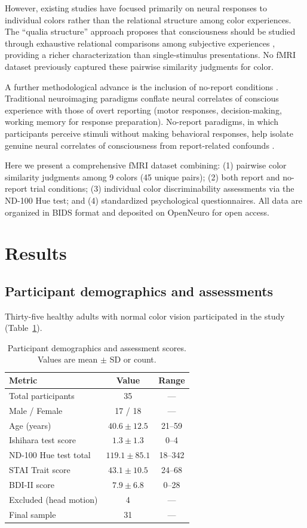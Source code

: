 \documentclass[11pt]{article}
\begin{document}
However, existing studies have focused primarily on neural responses to individual colors rather than the relational structure among color experiences. The ``qualia structure'' approach proposes that consciousness should be studied through exhaustive relational comparisons among subjective experiences \citep{haun2017}, providing a richer characterization than single-stimulus presentations. No fMRI dataset previously captured these pairwise similarity judgments for color.

A further methodological advance is the inclusion of no-report conditions \citep{tsuchiya2015}. Traditional neuroimaging paradigms conflate neural correlates of conscious experience with those of overt reporting (motor responses, decision-making, working memory for response preparation). No-report paradigms, in which participants perceive stimuli without making behavioral responses, help isolate genuine neural correlates of consciousness from report-related confounds \citep{koch2016}.

Here we present a comprehensive fMRI dataset combining: (1) pairwise color similarity judgments among 9 colors (45 unique pairs); (2) both report and no-report trial conditions; (3) individual color discriminability assessments via the ND-100 Hue test; and (4) standardized psychological questionnaires. All data are organized in BIDS format \citep{gorgolewski2016} and deposited on OpenNeuro for open access.

\section{Results}

\subsection{Participant demographics and assessments}

Thirty-five healthy adults with normal color vision participated in the study (Table~\ref{tab:demographics}).

\begin{table}[H]
\centering
\caption{Participant demographics and assessment scores. Values are mean $\pm$ SD or count.}
\label{tab:demographics}
\begin{tabular}{lcc}
\toprule
\textbf{Metric} & \textbf{Value} & \textbf{Range} \\
\midrule
Total participants & 35 & --- \\
Male / Female & 17 / 18 & --- \\
Age (years) & $40.6 \pm 12.5$ & 21--59 \\
Ishihara test score & $1.3 \pm 1.3$ & 0--4 \\
ND-100 Hue test total & $119.1 \pm 85.1$ & 18--342 \\
STAI Trait score & $43.1 \pm 10.5$ & 24--68 \\
BDI-II score & $7.9 \pm 6.8$ & 0--28 \\
Excluded (head motion) & 4 & --- \\
Final sample & 31 & --- \\
\bottomrule
\end{tabular}
\end{table}
\end{document}
